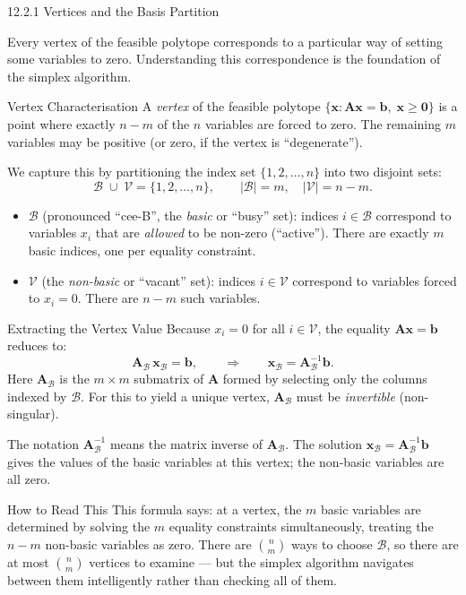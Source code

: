 \documentclass[aspectratio=169,10pt]{beamer}
\newcommand{\xv}{\mathbf{x}}
\newcommand{\bv}{\mathbf{b}}
\newcommand{\Av}{\mathbf{A}}
\newcommand{\calB}{\mathcal{B}}
\newcommand{\calV}{\mathcal{V}}
\begin{document}
\begin{frame}[allowframebreaks]{12.2.1 Vertices and the Basis Partition}

Every vertex of the feasible polytope corresponds to a particular way of setting
some variables to zero.  Understanding this correspondence is the foundation of the
simplex algorithm.

\begin{block}{Vertex Characterisation}
A \emph{vertex} of the feasible polytope $\{\xv : \Av\xv = \bv,\;\xv \ge \mathbf{0}\}$
is a point where exactly $n - m$ of the $n$ variables are forced to zero.  The
remaining $m$ variables may be positive (or zero, if the vertex is ``degenerate'').

We capture this by partitioning the index set $\{1, 2, \ldots, n\}$ into two disjoint
sets:
\[
  \calB \;\cup\; \calV = \{1, 2, \ldots, n\},\qquad |\calB| = m,\quad |\calV| = n - m.
\]
\begin{itemize}
  \item $\calB$ (pronounced ``cee-B'', the \emph{basic} or ``busy'' set): indices
        $i \in \calB$ correspond to variables $x_i$ that are \emph{allowed} to be
        non-zero (``active'').  There are exactly $m$ basic indices, one per
        equality constraint.
  \item $\calV$ (the \emph{non-basic} or ``vacant'' set): indices $i \in \calV$
        correspond to variables forced to $x_i = 0$.  There are $n - m$ such
        variables.
\end{itemize}
\end{block}

\begin{block}{Extracting the Vertex Value}
Because $x_i = 0$ for all $i \in \calV$, the equality $\Av\xv = \bv$ reduces to:
\[
  \Av_\calB\,\xv_\calB = \bv,
  \qquad\Rightarrow\qquad
  \xv_\calB = \Av_\calB^{-1}\bv.
\]
Here $\Av_\calB$ is the $m \times m$ submatrix of $\Av$ formed by selecting only
the columns indexed by $\calB$.  For this to yield a unique vertex, $\Av_\calB$
must be \emph{invertible} (non-singular).

The notation $\Av_\calB^{-1}$ means the matrix inverse of $\Av_\calB$.  The solution
$\xv_\calB = \Av_\calB^{-1}\bv$ gives the values of the basic variables at this
vertex; the non-basic variables are all zero.
\end{block}

\begin{alertblock}{How to Read This}
This formula says: at a vertex, the $m$ basic variables are determined by solving the
$m$ equality constraints simultaneously, treating the $n-m$ non-basic variables as
zero.  There are $\binom{n}{m}$ ways to choose $\calB$, so there are at most
$\binom{n}{m}$ vertices to examine --- but the simplex algorithm navigates between
them intelligently rather than checking all of them.
\end{alertblock}


\end{frame}
\end{document}
